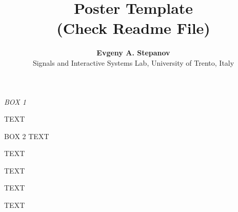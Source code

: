 \documentclass[portrait,a0,final]{a0poster}
\title{Poster Template\\ \vspace*{1cm} (Check Readme File)}
\author{
\textbf{Evgeny A. Stepanov}\\ \vspace*{0.5cm}
Signals and Interactive Systems Lab,
University of Trento, Italy
}
\date{}
\begin{document}
\makeptitle

\begin{psecbox}{{\color{red}\textit{BOX 1}}}

TEXT

\end{psecbox}
\begin{psecbox}{BOX 2}
TEXT


\end{psecbox}

\vspace*{0.5cm}

\begin{minipage}[t]{0.49\textwidth}

TEXT
\end{minipage}
\begin{minipage}[t]{0.49\textwidth}

TEXT
\end{minipage}

\vspace*{0.5cm}

\begin{minipage}[t]{0.49\textwidth}
TEXT
\end{minipage}
\begin{minipage}[t]{0.49\textwidth}
TEXT
\end{minipage}
\end{document}
